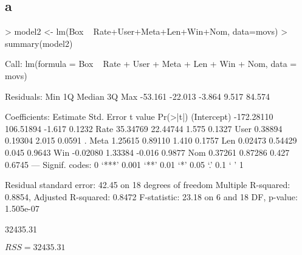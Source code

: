 \documentclass{article}
\begin{document}
\subsection*{a}
\begin{Schunk}
\begin{Sinput}
> model2 <- lm(Box ~ Rate+User+Meta+Len+Win+Nom, data=movs)
> summary(model2)
\end{Sinput}
\begin{Soutput}
Call:
lm(formula = Box ~ Rate + User + Meta + Len + Win + Nom, data = movs)

Residuals:
    Min      1Q  Median      3Q     Max 
-53.161 -22.013  -3.864   9.517  84.574 

Coefficients:
              Estimate Std. Error t value Pr(>|t|)  
(Intercept) -172.28110  106.51894  -1.617   0.1232  
Rate          35.34769   22.44744   1.575   0.1327  
User           0.38894    0.19304   2.015   0.0591 .
Meta           1.25615    0.89110   1.410   0.1757  
Len            0.02473    0.54429   0.045   0.9643  
Win           -0.02080    1.33384  -0.016   0.9877  
Nom            0.37261    0.87286   0.427   0.6745  
---
Signif. codes:  0 ‘***’ 0.001 ‘**’ 0.01 ‘*’ 0.05 ‘.’ 0.1 ‘ ’ 1

Residual standard error: 42.45 on 18 degrees of freedom
Multiple R-squared:  0.8854,	Adjusted R-squared:  0.8472 
F-statistic: 23.18 on 6 and 18 DF,  p-value: 1.505e-07
\end{Soutput}
\begin{Soutput}
[1] 32435.31
\end{Soutput}
\end{Schunk}

$RSS = 32435.31$
\end{document}
